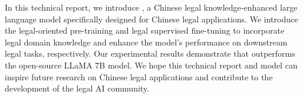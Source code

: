 In this technical report, we introduce \algo, a Chinese legal knowledge-enhanced large language model specifically designed for Chinese legal applications. We introduce the legal-oriented pre-training and legal supervised fine-tuning to incorporate legal domain knowledge and enhance the model's performance on downstream legal tasks, respectively. Our experimental results demonstrate that \algo outperforms the open-source LLaMA 7B model.  
We hope this technical report and \algo model can inspire future research on Chinese legal applications and contribute to the development of the legal AI community. 

\newpage
{
\small
}

